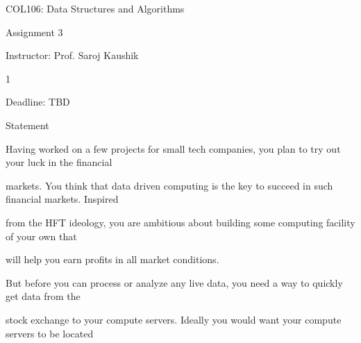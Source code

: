 \documentclass[a4paper,portrait,12pt]{article}
\begin{document}
\begin{flushleft}
COL106: Data Structures and Algorithms
\end{flushleft}





\begin{flushleft}
Assignment 3
\end{flushleft}


\begin{flushleft}
Instructor: Prof. Saroj Kaushik
\end{flushleft}





1





\begin{flushleft}
Deadline: TBD
\end{flushleft}





\begin{flushleft}
Statement
\end{flushleft}





\begin{flushleft}
Having worked on a few projects for small tech companies, you plan to try out your luck in the financial
\end{flushleft}


\begin{flushleft}
markets. You think that data driven computing is the key to succeed in such financial markets. Inspired
\end{flushleft}


\begin{flushleft}
from the HFT ideology, you are ambitious about building some computing facility of your own that
\end{flushleft}


\begin{flushleft}
will help you earn profits in all market conditions.
\end{flushleft}


\begin{flushleft}
But before you can process or analyze any live data, you need a way to quickly get data from the
\end{flushleft}


\begin{flushleft}
stock exchange to your compute servers. Ideally you would want your compute servers to be located
\end{flushleft}
\end{document}
